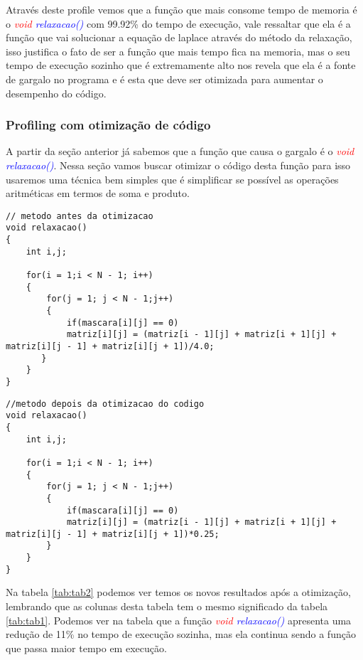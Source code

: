 \documentclass[]{article}
\begin{document}
Através deste profile vemos que a função que mais consome tempo de memoria é o \textit{\textcolor{red}{void} \textcolor{blue}{relaxacao()}} com 99.92\% do tempo de execução, vale ressaltar que ela é a função que vai solucionar a equação de laplace através do método da relaxação, isso justifica o fato de ser a função que mais tempo fica na memoria, mas o seu tempo de execução sozinho que é extremamente alto nos revela que ela é a fonte de gargalo no programa e é esta que deve ser otimizada para aumentar o desempenho do código. 

\subsubsection{Profiling com otimização de código}

A partir da seção anterior já sabemos que a função que causa o gargalo é o \textit{\textcolor{red}{void} \textcolor{blue}{relaxacao()}}. Nessa seção vamos buscar otimizar o código desta função para isso usaremos uma técnica bem simples que é simplificar se possível as operações aritméticas em termos de soma e produto.

\begin{lstlisting}
// metodo antes da otimizacao
void relaxacao()
{
    int i,j;

    for(i = 1;i < N - 1; i++)
    {
        for(j = 1; j < N - 1;j++)
        {
            if(mascara[i][j] == 0)
            matriz[i][j] = (matriz[i - 1][j] + matriz[i + 1][j] + matriz[i][j - 1] + matriz[i][j + 1])/4.0;
       }
    }
}
\end{lstlisting}

\begin{lstlisting}
//metodo depois da otimizacao do codigo
void relaxacao()
{
	int i,j;

	for(i = 1;i < N - 1; i++)
	{
		for(j = 1; j < N - 1;j++)
		{
			if(mascara[i][j] == 0)
			matriz[i][j] = (matriz[i - 1][j] + matriz[i + 1][j] + matriz[i][j - 1] + matriz[i][j + 1])*0.25;
		}
	}
}
\end{lstlisting}

Na tabela \ref{tab:tab2} podemos ver temos os novos resultados após a otimização, lembrando que as colunas desta tabela tem o mesmo significado da tabela \ref{tab:tab1}. Podemos ver na tabela que a função \textit{\textcolor{red}{void} \textcolor{blue}{relaxacao()}} apresenta uma redução de 11\% no tempo de execução sozinha, mas ela continua sendo a função que passa maior tempo em execução.   
\end{document}

